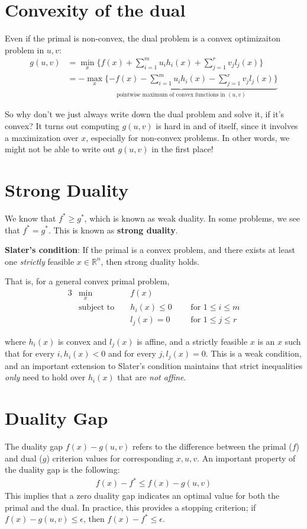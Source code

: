 \documentclass[11pt]{article}
\newcommand{\R}{\mathbb{R}}
\begin{document}
\section{Convexity of the dual}

Even if the primal is non-convex, the dual problem is a convex optimizaiton
problem in $u, v$:
\begin{align*}
g(u, v) &= \min_x \{f(x) + \sum_{i=1}^m u_i h_i(x) + \sum_{j=1}^r v_j l_j(x) \} \\
        &= - \underbrace{\max_x \{-f(x) - \sum_{i=1}^m u_i h_i(x) - \sum_{j=1}^r v_j l_j(x) \}}_{\text{pointwise maximum of convex functions in } (u, v)}
\end{align*}

So why don't we just always write down the dual problem and solve it, if it's
convex? It turns out computing $g(u, v)$ is hard in and of itself, since it
involves a maximization over $x$, especially for non-convex problems. In other
words, we might not be able to write out $g(u, v)$ in the first place!

\section{Strong Duality}
We know that $f^* \geq g^*$, which is known as weak duality. In some problems, we
see that $f^* = g^*$. This is known as \textbf{strong duality}.

\textbf{Slater's condition}: If the primal is a convex problem, and there exists
at least one \textit{strictly} feasible $x \in \R^n$, then strong duality holds.

That is, for a general convex primal problem,
\begin{alignat*}{3}
&\min_x &&f(x) \\
&\text{subject to } && h_i(x) \leq 0 ~~~&&\text{for } 1 \leq i \leq m \\
&&& l_j(x) = 0 ~~~&&\text{for } 1 \leq j \leq r
\end{alignat*}

where $h_i(x)$ is convex and $l_j(x)$ is affine, and a strictly feasible $x$ is
an $x$ such that for every $i, h_i(x) < 0$ and for every
$j, l_j(x) = 0$. This is a weak condition, and an important extension to Slater's condition maintains that strict inequalities \emph{only} need to hold over $h_i\left(x\right)$ that are \emph{not affine}.

\section{Duality Gap}
The duality gap $f\left(x\right) - g\left(u,v\right)$ refers to the difference between the primal ($f$) and dual ($g$) criterion values for corresponding $x, u, v$. An important property of the duality gap is the following:
\begin{align*}
f\left(x\right) - f^{*} \leq f\left(x\right) - g\left(u,v\right)
\end{align*}
This implies that a zero duality gap indicates an optimal value for both the primal and the dual. In practice, this provides a stopping criterion; if $f\left(x\right) - g\left(u,v\right) \leq \epsilon$, then $f\left(x\right) - f^{*} \leq \epsilon$.
\end{document}
